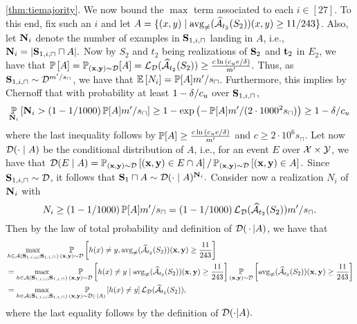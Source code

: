 \begin{proofof}{\cref{thm:tiemajority}.}
We now bound the $\max$ term associated to each $i \in [27]$. To this end, fix such an $i$ and let $ A=\{ (x,y)\mid \operatorname{\mathrm{avg}_{\not=}}(\widehat{\mathcal{A}}_{t_{2}}(S_{2}))(x,y)\geq 11/243\}$. Also, let $\mathbf{N}_{i}$ denote the number of examples in $ \mathbf{S}_{1,i,\sqcap} $ landing in $ A  $, i.e., $ \mathbf{N}_{i}=| \mathbf{S}_{1,i,\sqcap}\sqcap A|.$  
Now by $ S_{2} $ and $ t_{2} $ being realizations of $ \mathbf{S}_{2} $ and $ \mathbf{t}_{2} $ in $ E_{2}$, we have that $ \operatorname*{\mathbb{P}}\left[A\right]=\operatorname*{\mathbb{P}}_{(\mathbf{x},\mathbf{y})\sim\mathcal{D}}[A]=\operatorname{\mathcal{L}}_{\mathcal{D}}(\widehat{\mathcal{A}}_{t_{2}}(S_{2}))\geq \frac{c\ln{\left(c_{u}e/\delta \right)}}{m'}.$
Thus, as $\mathbf{S}_{1,i,\sqcap}\sim \mathcal{D}^{m'/s_{\sqcap}}$, we have that $ \operatorname*{\mathbb{E}}\left[N_{i}\right]=\operatorname*{\mathbb{P}}[A]m'/s_{\sqcap}$. 
Furthermore, this implies by Chernoff that with probability at least $ 1-\delta/c_{u} $ over $ \mathbf{S}_{1,i,\sqcap} $,  
\begin{align*}
 \operatorname*{\mathbb{P}}_{\mathbf{N}_{i}}\left[\mathbf{N}_{i}> (1-1/1000)\operatorname*{\mathbb{P}}[A]m'/s_{\sqcap}\right] \geq 1- \exp{\left(-\operatorname*{\mathbb{P}}[A]m'/(2\cdot 1000^{2}s_{\sqcap} )\right)} \geq 1-\delta/c_{u}
\end{align*}
where the last inequality follows by $ \operatorname*{\mathbb{P}}[A]\geq \frac{c\ln{\left(c_{u}e/\delta \right)}}{m'}$ and $ c\geq 2\cdot 10^{6}s_{\sqcap}.$  
Let now $ \mathcal{D}(\cdot \mid A) $ be the conditional distribution of $ A $, i.e., for an event $ E $ over $ \mathcal{X}\times \mathcal{Y}  $, we have that $ \mathcal{D}(E\mid A)=\operatorname*{\mathbb{P}}_{(\mathbf{x},\mathbf{y})\sim \mathcal{D}}\left[(\mathbf{x},\mathbf{y})\in E\cap A\right]/\operatorname*{\mathbb{P}}_{(\mathbf{x},\mathbf{y})\sim \mathcal{D}}\left[(\mathbf{x},\mathbf{y})\in A\right].$ 
Since $ \mathbf{S}_{1,i,\sqcap}\sim \mathcal{D} $, it follows that $ \mathbf{S}_{1}\sqcap A \sim \mathcal{D}(\cdot \mid A)^{\mathbf{N}_{i}}.$  
Consider now a realization $ N_{i} $ of $ \mathbf{N}_{i}$ with 
\[ N_i \geq (1-1/1000)\operatorname*{\mathbb{P}}[A]m'/s_{\sqcap}=(1-1/1000)\operatorname{\mathcal{L}}_{\mathcal{D}}(\widehat{\mathcal{A}}_{t_{2}}(S_{2}))m'/s_{\sqcap}. \]   
Then by the law of total probability and definition of $\mathcal{D}(\, \cdot \,| A)$, we have that 
\begin{align*}
&\max_{h\in \mathcal{A}(\mathbf{S}_{1,i,\sqcup};\mathbf{S}_{1,i,\sqcap})}\operatorname*{\mathbb{P}}_{(\mathbf{x},\mathbf{y})\sim \mathcal{D}}\left[h(x)\not=y,\operatorname{\mathrm{avg}_{\not=}}(\widehat{\mathcal{A}}_{t_{2}}(S_{2}))(\mathbf{x},\mathbf{y})\geq \frac{11}{243}\right] \\
&=\max_{h\in \mathcal{A}(\mathbf{S}_{1,i,\sqcup};\mathbf{S}_{1,i,\sqcap})}\operatorname*{\mathbb{P}}_{(\mathbf{x},\mathbf{y})\sim \mathcal{D}}\left[h(x)\not=y\mid\operatorname{\mathrm{avg}_{\not=}}(\widehat{\mathcal{A}}_{t_{2}}(S_{2}))(\mathbf{x},\mathbf{y})\geq \frac{11}{243}\right]\operatorname*{\mathbb{P}}_{(\mathbf{x},\mathbf{y})\sim \mathcal{D}}\left[\operatorname{\mathrm{avg}_{\not=}}(\widehat{\mathcal{A}}_{t_{2}}(S_{2}))(\mathbf{x},\mathbf{y})\geq \frac{11}{243}\right] \\
&= \max_{h\in \mathcal{A}(\mathbf{S}_{1,i,\sqcup};\mathbf{S}_{1,i,\sqcap})}\operatorname*{\mathbb{P}}_{(\mathbf{x},\mathbf{y})\sim \mathcal{D}(\cdot\mid A)}\left[h(x)\not=y\right]\operatorname{\mathcal{L}}_{\mathcal{D}}(\widehat{\mathcal{A}}_{t_{2}}(S_{2})),
\end{align*}
where the last equality follows by the definition of $ \mathcal{D}(\cdot | A).$ 

\end{proofof}
